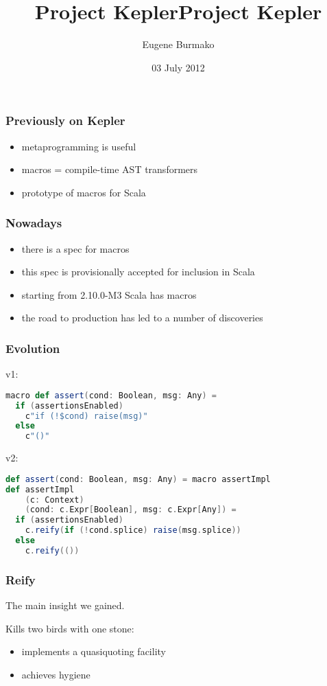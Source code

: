 \documentclass[hyperref={bookmarks=false}]{beamer}
\title{Project Kepler}
\begin{document}
\title{Project Kepler}
\author{Eugene Burmako}
\date{03 July 2012}
\maketitle

\begin{frame}[fragile]
\frametitle{Previously on Kepler}

\begin{itemize}
\item metaprogramming is useful
\item macros = compile-time AST transformers
\item prototype of macros for Scala
\end{itemize}
\end{frame}

\begin{frame}[fragile]
\frametitle{Nowadays}

\begin{itemize}
\item there is a spec for macros
\item this spec is provisionally accepted for inclusion in Scala
\item starting from 2.10.0-M3 Scala has macros
\item the road to production has led to a number of discoveries
\end{itemize}
\end{frame}

\begin{frame}[fragile]
\frametitle{Evolution}
v1:
\begin{lstlisting}[language=scala]
macro def assert(cond: Boolean, msg: Any) =
  if (assertionsEnabled)
    c"if (!$cond) raise(msg)"
  else
    c"()"
\end{lstlisting}

v2:
\begin{lstlisting}[language=scala]
def assert(cond: Boolean, msg: Any) = macro assertImpl
def assertImpl
    (c: Context)
    (cond: c.Expr[Boolean], msg: c.Expr[Any]) =
  if (assertionsEnabled)
    c.reify(if (!cond.splice) raise(msg.splice))
  else
    c.reify(())
\end{lstlisting}
\end{frame}

\begin{frame}[fragile]
\frametitle{Reify}

The main insight we gained.

Kills two birds with one stone:
\begin{itemize}
\item implements a quasiquoting facility
\item achieves hygiene
\end{itemize}
\end{frame}
\end{document}
